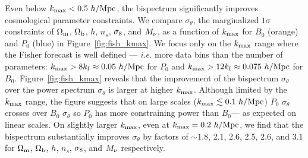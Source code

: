 Even below $k_{\rm max} < 0.5~h/{\rm Mpc}$, the bispectrum significantly 
improves cosmological parameter constraints. We compare $\sigma_\theta$, 
the marginalized $1\sigma$ constraints of $\Omega_{\rm m}$, $\Omega_{\rm b}$, $h$, $n_s$, $\sigma_8$, 
and $M_\nu$, as a function of $k_{\rm max}$ for $B_0$ (orange) and $P_0$ 
(blue) in Figure~\ref{fig:fish_kmax}. We focus only on the $k_{\rm max}$ range 
where the Fisher forecast is well defined --- \emph{i.e.} more data bins 
than the number of parameters: $k_{\rm max} > 8 k_{\rm f} \approx 0.05~h/{\rm Mpc}$ 
for $P_0$ and $k_{\rm max} > 12 k_{\rm f} \approx 0.075~h/{\rm Mpc}$ for 
$B_0$. Figure~\ref{fig:fish_kmax} reveals that the improvement of the
bispectrum $\sigma_\theta$ over the power spectrum $\sigma_\theta$ is 
larger at higher $k_{\rm max}$. Although limited by the $k_{\rm max}$ range, 
the figure suggests that on large scales ($k_{\rm max}\lesssim 0.1~h/{\rm Mpc}$) 
$P_0$ $\sigma_\theta$ crosses over $B_0$ $\sigma_\theta$ so $P_0$ has more 
constraining power than $B_0$--- as expected on linear scales. On slightly 
larger $k_{\rm max}$, even at $k_{\rm max} = 0.2~h/{\rm Mpc}$, we find that 
the bispectrum substantially improves $\sigma_\theta$ by factors of
$\sim 1.8$, 2.1, 2.6, 2.5, 2.6, and $3.1$ for $\Omega_{\rm m}$, $\Omega_{\rm b}$, $h$, $n_s$, $\sigma_8$, 
and $M_\nu$ respectively. 

